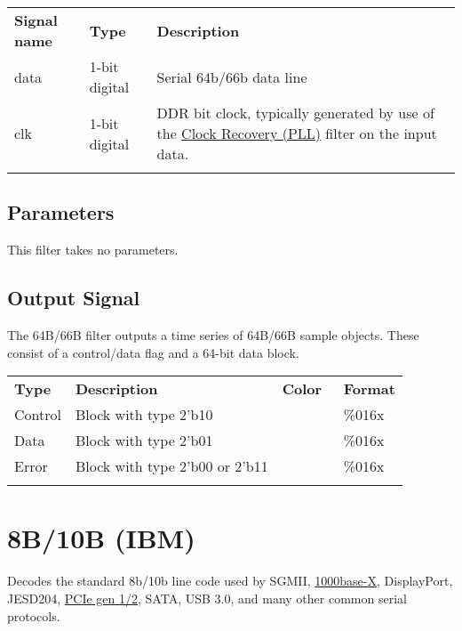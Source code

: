\begin{tabularx}{16cm}{llX}
\thickhline
\textbf{Signal name} & \textbf{Type} & \textbf{Description} \\
\thickhline
data & 1-bit digital & Serial 64b/66b data line \\
\thinhline
clk & 1-bit digital & DDR bit clock, typically generated by use of the \hyperref[filter:cdrpll]{Clock Recovery
(PLL)} filter on the input data.\\
\thickhline
\end{tabularx}

\subsection{Parameters}

This filter takes no parameters.

\subsection{Output Signal}

The 64B/66B filter outputs a time series of 64B/66B sample objects. These consist of a control/data flag and
a 64-bit data block.

\begin{tabularx}{16cm}{lllX}
\thickhline
\textbf{Type} & \textbf{Description} & \textbf{Color} & \textbf{Format} \\
\thickhline
Control & Block with type 2'b10 & \cellcolor{control}\textcolor{white}{Control} & \%016x \\
\thinhline
Data & Block with type 2'b01 & \cellcolor{data}\textcolor{white}{Data} & \%016x \\
\thinhline
Error & Block with type 2'b00 or 2'b11 & \cellcolor{error}\textcolor{white}{Error} & \%016x \\
\thickhline
\end{tabularx}

\pagebreak
\section{8B/10B (IBM)}
\label{filter:8b10b}

Decodes the standard 8b/10b line code used by SGMII, \hyperref[filter:1000basex]{1000base-X}, DisplayPort, JESD204,
\hyperref[filter:pcie2_logical]{PCIe gen 1/2}, SATA, USB 3.0, and many other common serial protocols.

